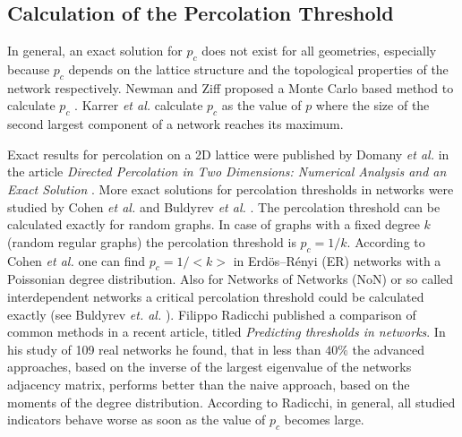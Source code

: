 \documentclass[a4paper,10pt]{scrbook}
\begin{document}
\subsection{Calculation of the Percolation Threshold}
In general, an exact solution for $p_c$ does not exist for all geometries, especially because $p_c$ depends on the lattice structure and the topological properties of the network respectively. Newman and Ziff proposed a Monte Carlo based method to calculate $p_c$ \cite{Ziff2000}. Karrer \textit{et al.} \cite{Karrer2014} calculate $p_c$ as the value of $p$ where the size of the second largest component of a network reaches its maximum. 

Exact results for percolation on a 2D lattice were published by Domany \textit{et al.} in the article \textit{Directed Percolation in Two Dimensions: Numerical Analysis and an Exact Solution} \cite{Domany1981}. More exact solutions for percolation thresholds in networks were studied by Cohen \textit{et al.} \cite{cohen2010complex} and Buldyrev \textit{et al.} \cite{Buldyrev2010}. The percolation threshold can be calculated exactly for random graphs. In case of graphs with a fixed degree $k$ (random regular graphs) the percolation threshold is $p_c=1/k$. According to Cohen \textit{et al.} \cite{cohen2010complex} one can find $p_c=1/<k>$ in Erd\"os–R\'{e}nyi (ER) networks with a Poissonian degree distribution. Also for Networks of Networks (NoN) or so called interdependent networks a critical percolation threshold could be calculated exactly (see Buldyrev \textit{et. al.} \cite{Buldyrev2010}). Filippo Radicchi \cite{Radicchi2015} published a comparison of common methods in a recent article, titled \textit{Predicting thresholds in networks}. In his study of 109 real networks he found, that in less than $40\%$ the advanced approaches, based on the inverse of the largest eigenvalue of the networks adjacency matrix, performs better than the naive approach, based on the moments of the degree distribution. According to Radicchi, in general, all studied indicators behave worse as soon as the value of $p_c$ becomes large. 


\end{document}
